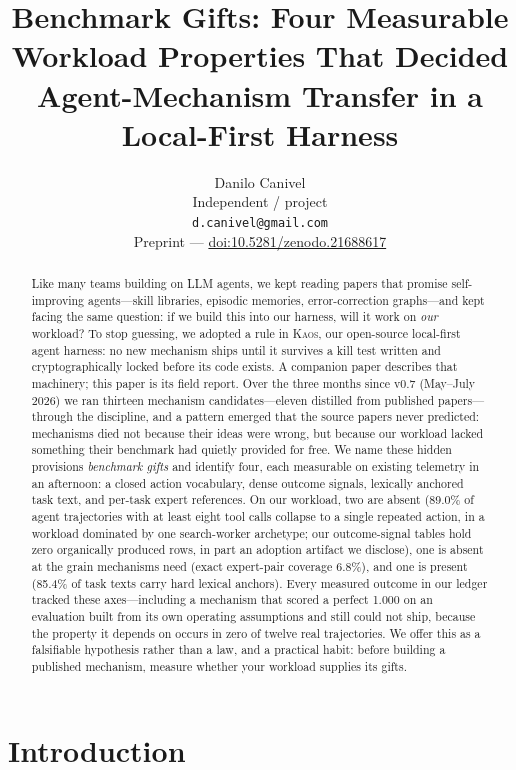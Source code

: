 \documentclass[11pt]{article}
\title{Benchmark Gifts: Four Measurable Workload Properties That Decided\\Agent-Mechanism Transfer in a Local-First Harness}
\author{
  Danilo Canivel \\
  Independent / \kaos{} project \\
  \texttt{d.canivel@gmail.com} \\[2pt]
  \small Preprint --- \href{https://doi.org/10.5281/zenodo.21688617}{doi:10.5281/zenodo.21688617}
}
\newcommand{\kaos}{\textsc{Kaos}}
\begin{document}
\maketitle

\begin{abstract}
Like many teams building on LLM agents, we kept reading papers that promise self-improving agents---skill libraries, episodic memories, error-correction graphs---and kept facing the same question: if we build this into our harness, will it work on \emph{our} workload? To stop guessing, we adopted a rule in \kaos{}, our open-source local-first agent harness: no new mechanism ships until it survives a kill test written and cryptographically locked before its code exists. A companion paper describes that machinery; this paper is its field report. Over the three months since v0.7 (May--July 2026) we ran thirteen mechanism candidates---eleven distilled from published papers---through the discipline, and a pattern emerged that the source papers never predicted: mechanisms died not because their ideas were wrong, but because our workload lacked something their benchmark had quietly provided for free. We name these hidden provisions \emph{benchmark gifts} and identify four, each measurable on existing telemetry in an afternoon: a closed action vocabulary, dense outcome signals, lexically anchored task text, and per-task expert references. On our workload, two are absent (89.0\% of agent trajectories with at least eight tool calls collapse to a single repeated action, in a workload dominated by one search-worker archetype; our outcome-signal tables hold zero organically produced rows, in part an adoption artifact we disclose), one is absent at the grain mechanisms need (exact expert-pair coverage 6.8\%), and one is present (85.4\% of task texts carry hard lexical anchors). Every measured outcome in our ledger tracked these axes---including a mechanism that scored a perfect 1.000 on an evaluation built from its own operating assumptions and still could not ship, because the property it depends on occurs in zero of twelve real trajectories. We offer this as a falsifiable hypothesis rather than a law, and a practical habit: before building a published mechanism, measure whether your workload supplies its gifts.
\end{abstract}

\section{Introduction}
\end{document}
